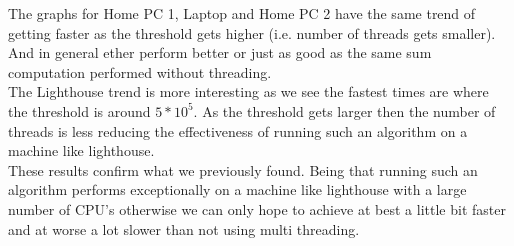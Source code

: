 \documentclass[a4paper, 12pt]{article}
\begin{document}
		The graphs for Home PC 1, Laptop and Home PC 2 have the same trend of getting faster as the threshold gets higher (i.e. number of threads gets smaller). And in general ether perform better or just as good as the same sum computation performed without threading.\\
		
		The Lighthouse trend is more interesting as we see the fastest times are where the threshold is around $5*10^5$. As the threshold gets larger then the number of threads is less reducing the effectiveness of running such an algorithm on a machine like lighthouse.\\
	
		These results confirm what we previously found. Being that running such an algorithm performs exceptionally on a machine like lighthouse with a large number of CPU's otherwise we can only hope to achieve at best a little bit faster and at worse a lot slower than not using multi threading.
			
\end{document}
